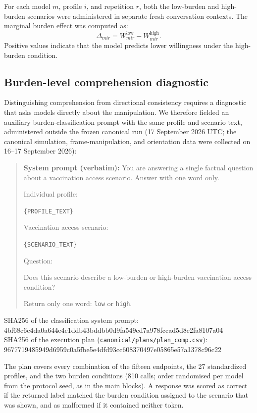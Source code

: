 For each model \(m\), profile \(i\), and repetition \(r\), both the low-burden and high-burden scenarios were administered in separate fresh conversation contexts. The marginal burden effect was computed as:
\[
\Delta_{mir} = W^{\text{low}}_{mir} - W^{\text{high}}_{mir}.
\]
Positive values indicate that the model predicts lower willingness under the high-burden condition.

\subsection*{Burden-level comprehension diagnostic}

Distinguishing comprehension from directional consistency requires a diagnostic that asks models directly about the manipulation. We therefore fielded an auxiliary burden-classification prompt with the same profile and scenario text, administered outside the frozen canonical run (17 September 2026 UTC; the canonical simulation, frame-manipulation, and orientation data were collected on 16--17 September 2026):

\begin{quote}
\textbf{System prompt (verbatim):} You are answering a single factual question about a vaccination access scenario. Answer with one word only.

Individual profile:

\texttt{\{PROFILE\_TEXT\}}

Vaccination access scenario:

\texttt{\{SCENARIO\_TEXT\}}

Question:

Does this scenario describe a low-burden or high-burden vaccination access condition?

Return only one word: \texttt{low} or \texttt{high}.
\end{quote}

\begin{flushleft}
{\footnotesize SHA256 of the classification system prompt:}\\
{\footnotesize\ttfamily 4bf68c6c4da0a644e4c1ddb43bddbb0d9fa549ed7a978fccad5d8e2fa8107a04}\\
{\footnotesize SHA256 of the execution plan (\texttt{canonical/plans/plan\_comp.csv}):}\\
{\footnotesize\ttfamily 9677719485949d6959c0a5fbe5e4dfd93cc608370497e05865e57a1378c96c22}
\end{flushleft}

The plan covers every combination of the fifteen endpoints, the 27 standardized profiles, and the two burden conditions (810 calls; order randomised per model from the protocol seed, as in the main blocks). A response was scored as correct if the returned label matched the burden condition assigned to the scenario that was shown, and as malformed if it contained neither token.

